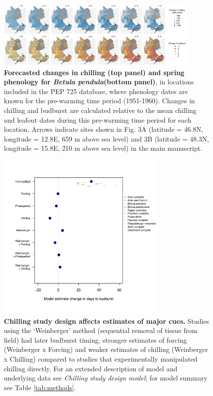 \documentclass{article}
\begin{document}
\begin{figure}[h!]
\centering
\noindent \includegraphics[width=0.90\textwidth]{..//..//analyses/bb_analysis/figures/forecasting/heatmapsbetpepfinalarrows.png}
\caption{\textbf{Forecasted changes in chilling (top panel) and spring phenology for \emph{Betula pendula}(bottom panel)}, in locations included in the PEP 725 database, where phenology dates are known for the pre-warming time period (1951-1960). Changes in chilling and budburst are calculated relative to the mean chilling and leafout dates during this pre-warming time period for each location. Arrows indicate sites shown in Fig. 3A (latitude = 46.8\degree N, longitude =  12.8\degree E, 659 m above sea level) and 3B (latitude = 48.3\degree N, longitude =  15.8\degree E, 210 m above sea level) in the main manuscript.} 
\label{fig:foremap}
\end{figure}

\begin{figure}[h!]
\centering
\noindent \includegraphics[width=0.75\textwidth]{..//..//analyses/figures/weinberger_MU_4supp.pdf}
\caption{\textbf{Chilling study design affects estimates of major cues.} Studies using the `Weinberger' method (sequential removal of tissue from field) had later budburst timing, stronger estimates of forcing (Weinberger x Forcing) and weaker estimates of chilling (Weinberger x Chilling) compared to studies that experimentally manipulated chilling directly. For an extended description of model and underlying data see \emph{Chilling study design model}; for model summary see Table \ref{tab:methods}.}
\label{fig:weinberger}
\end{figure}
\end{document}
